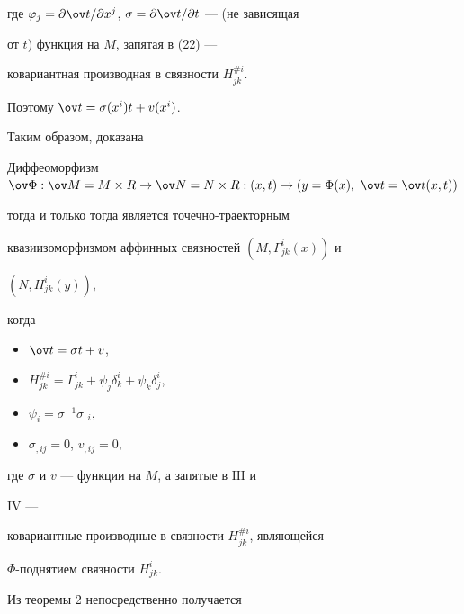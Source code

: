 где $\varphi_j=\partial\ov t/\partial x^j$, $\sigma=\partial\ov 


t/\partial t$ --- (не зависящая 


от $t$) функция на $M$, запятая в (22) --- 


ковариантная производная в связности $H^{\# i}_{j k}$. 


Поэтому $\ov t=\sigma(x^i)t+v(x^i)$. 


 


Таким образом, доказана 


 


\begin{thm} 


Диффеоморфизм $\ov\Phi:\ov M=M\times R\to\ov N=N\times 


R:(x,t)\to(y=\Phi(x),\ \ov t=\ov t(x,t))$ 


тогда и только тогда является точечно-траекторным 


квазиизоморфизмом аффинных связностей $(M,\Gamma^i_{j k}(x))$ и 


$(N,H^i_{j k}(y))$, 


когда 


\begin{itemize} 


\item[I.] $\ov t=\sigma t+v$, 


\item[II.] $H^{\# i}_{j k}=\Gamma^i_{j k}+\psi_j\delta^i_k+ 


\psi_k\delta^i_j$, 


\item[III.] $\psi_i=\sigma^{-1}\sigma_{,i}$, 


\item[IV.] $\sigma_{,i j}=0$, $v_{,i j}=0,$ 


\end{itemize} 


где $\sigma$ и $v$ --- функции на $M$, а запятые в $\mathrm{III}$ и 


$\mathrm{IV}$ --- 


ковариантные производные в связности $H^{\# i}_{j k}$, являющейся 


$\Phi$-поднятием связности $H^i_{j k}$. 


\end{thm} 


 


Из теоремы 2 непосредственно получается


